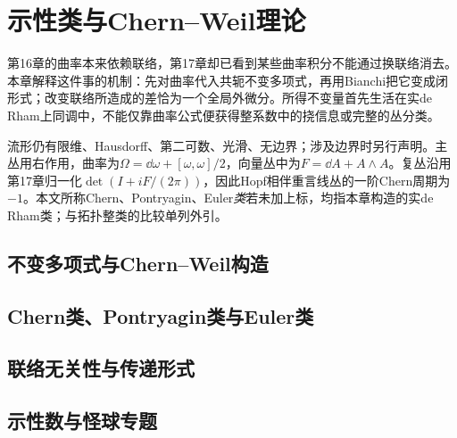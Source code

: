\chapter{示性类与Chern--Weil理论}
\label{ch:18-characteristic}

第16章的曲率本来依赖联络，第17章却已看到某些曲率积分不能通过换联络消去。本章解释这件事的机制：先对曲率代入共轭不变多项式，再用Bianchi把它变成闭形式；改变联络所造成的差恰为一个全局外微分。所得不变量首先生活在实de Rham上同调中，不能仅靠曲率公式便获得整系数中的挠信息或完整的丛分类。

流形仍有限维、Hausdorff、第二可数、光滑、无边界；涉及边界时另行声明。主丛用右作用，曲率为$\Omega=\dd\omega+[\omega,\omega]/2$，向量丛中为$F=\dd A+A\wedge A$。复丛沿用第17章归一化$\det(I+iF/(2\pi))$，因此Hopf相伴重言线丛的一阶Chern周期为$-1$。本文所称Chern、Pontryagin、Euler\emph{类}若未加上标，均指本章构造的实de Rham类；与拓扑整类的比较单列外引。

\section{不变多项式与Chern--Weil构造}


\section{Chern类、Pontryagin类与Euler类}



\section{联络无关性与传递形式}



\section{示性数与怪球专题}




